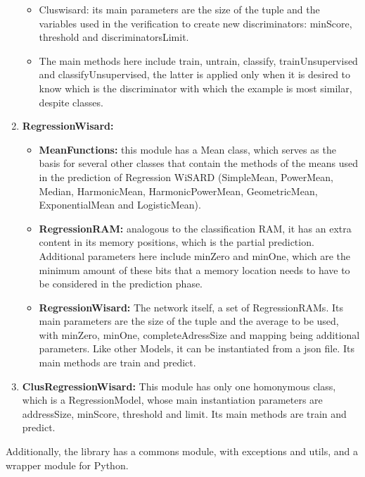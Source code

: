 \documentclass[12pt]{article}
\begin{document}
\begin{enumerate}
          \begin{itemize}
              \item Cluswisard: its main parameters are the size of the tuple and the variables used in the verification to create new discriminators: minScore, threshold and discriminatorsLimit.
              \item The main methods here include train, untrain, classify, trainUnsupervised and classifyUnsupervised, the latter is applied only when it is desired to know which is the discriminator with which the example is most similar, despite classes.
          \end{itemize}
    \item \textbf{RegressionWisard:}
          \begin{itemize}
              \item \textbf{MeanFunctions:} this module has a Mean class, which serves as the basis for several other classes that contain the methods of the means used in the prediction of Regression WiSARD (SimpleMean, PowerMean, Median, HarmonicMean, HarmonicPowerMean, GeometricMean, ExponentialMean and LogisticMean).
              \item \textbf{RegressionRAM:} analogous to the classification RAM, it has an extra content in its memory positions, which is the partial prediction. Additional parameters here include minZero and minOne, which are the minimum amount of these bits that a memory location needs to have to be considered in the prediction phase.
              \item \textbf{RegressionWisard:} The network itself, a set of RegressionRAMs. Its main parameters are the size of the tuple and the average to be used, with minZero, minOne, completeAdressSize and mapping being additional parameters. Like other Models, it can be instantiated from a json file. Its main methods are train and predict.
          \end{itemize}
    \item \textbf{ClusRegressionWisard:} This module has only one homonymous class, which is a RegressionModel, whose main instantiation parameters are addressSize, minScore, threshold and limit. Its main methods are train and predict.
\end{enumerate}

Additionally, the library has a commons module, with exceptions and utils, and a wrapper module for Python.



\end{document}
